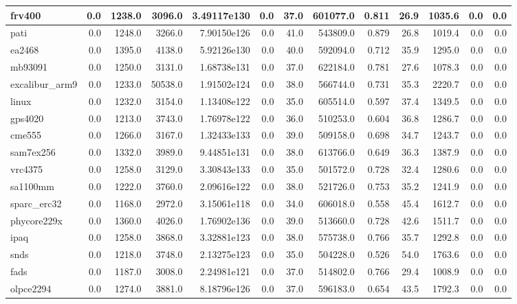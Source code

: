 \begin{tabular}{|l r r r r| r r r r r r | r r|}
\hline
frv400 & 0.0 & 1238.0 & 3096.0 & 3.49117e130 & 0.0 & 37.0 & 601077.0 & 0.811 & 26.9 & 1035.6 & 0.0 & 0.0 \\
\hline
pati & 0.0 & 1248.0 & 3266.0 & 7.90150e126 & 0.0 & 41.0 & 543809.0 & 0.879 & 26.8 & 1019.4 & 0.0 & 0.0 \\
\hline
ea2468 & 0.0 & 1395.0 & 4138.0 & 5.92126e130 & 0.0 & 40.0 & 592094.0 & 0.712 & 35.9 & 1295.0 & 0.0 & 0.0 \\
\hline
mb93091 & 0.0 & 1250.0 & 3131.0 & 1.68738e131 & 0.0 & 37.0 & 622184.0 & 0.781 & 27.6 & 1078.3 & 0.0 & 0.0 \\
\hline
excalibur\_arm9 & 0.0 & 1233.0 & 50538.0 & 1.91502e124 & 0.0 & 38.0 & 566744.0 & 0.731 & 35.3 & 2220.7 & 0.0 & 0.0 \\
\hline
linux & 0.0 & 1232.0 & 3154.0 & 1.13408e122 & 0.0 & 35.0 & 605514.0 & 0.597 & 37.4 & 1349.5 & 0.0 & 0.0 \\
\hline
gps4020 & 0.0 & 1213.0 & 3743.0 & 1.76978e122 & 0.0 & 36.0 & 510253.0 & 0.604 & 36.8 & 1286.7 & 0.0 & 0.0 \\
\hline
cme555 & 0.0 & 1266.0 & 3167.0 & 1.32433e133 & 0.0 & 39.0 & 509158.0 & 0.698 & 34.7 & 1243.7 & 0.0 & 0.0 \\
\hline
sam7ex256 & 0.0 & 1332.0 & 3989.0 & 9.44851e131 & 0.0 & 38.0 & 613766.0 & 0.649 & 36.3 & 1387.9 & 0.0 & 0.0 \\
\hline
vrc4375 & 0.0 & 1258.0 & 3129.0 & 3.30843e133 & 0.0 & 35.0 & 501572.0 & 0.728 & 32.4 & 1280.6 & 0.0 & 0.0 \\
\hline
sa1100mm & 0.0 & 1222.0 & 3760.0 & 2.09616e122 & 0.0 & 38.0 & 521726.0 & 0.753 & 35.2 & 1241.9 & 0.0 & 0.0 \\
\hline
sparc\_erc32 & 0.0 & 1168.0 & 2972.0 & 3.15061e118 & 0.0 & 34.0 & 606018.0 & 0.558 & 45.4 & 1612.7 & 0.0 & 0.0 \\
\hline
phycore229x & 0.0 & 1360.0 & 4026.0 & 1.76902e136 & 0.0 & 39.0 & 513660.0 & 0.728 & 42.6 & 1511.7 & 0.0 & 0.0 \\
\hline
ipaq & 0.0 & 1258.0 & 3868.0 & 3.32881e123 & 0.0 & 38.0 & 575738.0 & 0.766 & 35.7 & 1292.8 & 0.0 & 0.0 \\
\hline
snds & 0.0 & 1218.0 & 3748.0 & 2.13275e123 & 0.0 & 35.0 & 504228.0 & 0.526 & 54.0 & 1763.6 & 0.0 & 0.0 \\
\hline
fads & 0.0 & 1187.0 & 3008.0 & 2.24981e121 & 0.0 & 37.0 & 514802.0 & 0.766 & 29.4 & 1008.9 & 0.0 & 0.0 \\
\hline
olpce2294 & 0.0 & 1274.0 & 3881.0 & 8.18796e126 & 0.0 & 37.0 & 596183.0 & 0.654 & 43.5 & 1792.3 & 0.0 & 0.0 \\

\end{tabular}
